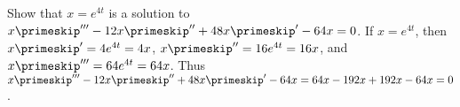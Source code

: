{Show that $x = e^{4t}$ is a solution to $x\primeskip'''-12 x\primeskip'' + 48 x\primeskip' - 64 x = 0$.}
{If $x=e^{4t}$, then $x\primeskip' = 4e^{4t}=4x$, $x\primeskip'' = 16e^{4t} = 16x$, and $x\primeskip''' = 64e^{4t} = 64x$. Thus $x\primeskip'''-12x\primeskip''+48x\primeskip'-64x = 64x-192x+192x-64x=0$.}